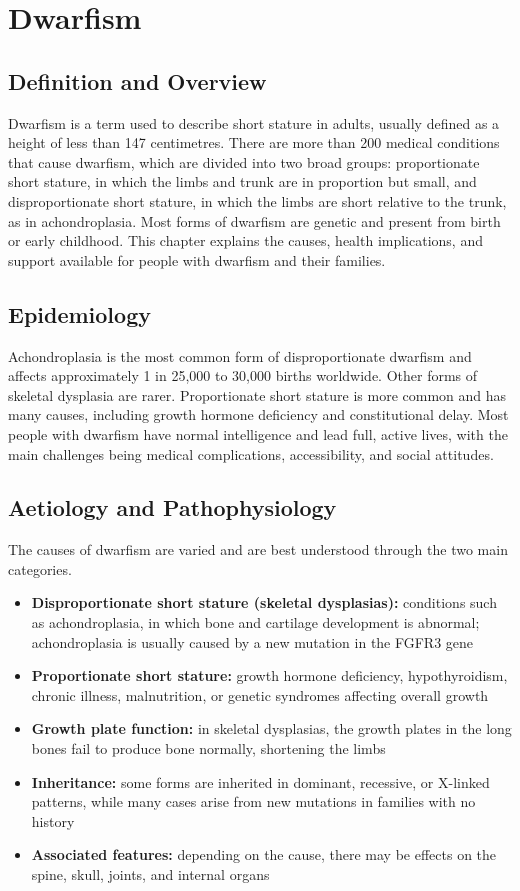 \chapter{Dwarfism}

\section*{Definition and Overview}
Dwarfism is a term used to describe short stature in adults, usually defined as a height of less than 147 centimetres. There are more than 200 medical conditions that cause dwarfism, which are divided into two broad groups: proportionate short stature, in which the limbs and trunk are in proportion but small, and disproportionate short stature, in which the limbs are short relative to the trunk, as in achondroplasia. Most forms of dwarfism are genetic and present from birth or early childhood. This chapter explains the causes, health implications, and support available for people with dwarfism and their families.

\section*{Epidemiology}
Achondroplasia is the most common form of disproportionate dwarfism and affects approximately 1 in 25,000 to 30,000 births worldwide. Other forms of skeletal dysplasia are rarer. Proportionate short stature is more common and has many causes, including growth hormone deficiency and constitutional delay. Most people with dwarfism have normal intelligence and lead full, active lives, with the main challenges being medical complications, accessibility, and social attitudes.

\section*{Aetiology and Pathophysiology}
The causes of dwarfism are varied and are best understood through the two main categories.
\begin{itemize}
    \item \textbf{Disproportionate short stature (skeletal dysplasias):} conditions such as achondroplasia, in which bone and cartilage development is abnormal; achondroplasia is usually caused by a new mutation in the FGFR3 gene
    \item \textbf{Proportionate short stature:} growth hormone deficiency, hypothyroidism, chronic illness, malnutrition, or genetic syndromes affecting overall growth
    \item \textbf{Growth plate function:} in skeletal dysplasias, the growth plates in the long bones fail to produce bone normally, shortening the limbs
    \item \textbf{Inheritance:} some forms are inherited in dominant, recessive, or X-linked patterns, while many cases arise from new mutations in families with no history
    \item \textbf{Associated features:} depending on the cause, there may be effects on the spine, skull, joints, and internal organs
\end{itemize}

